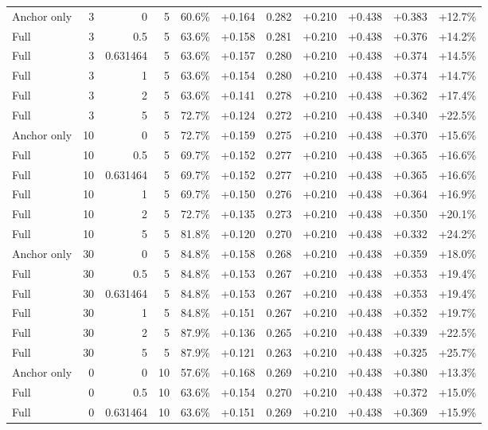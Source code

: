 \begin{table}[htbp]
\begin{tabular}{lrrrccccccc}
Anchor only & 3 & 0 & 5 & 60.6\% & +0.164 & 0.282 & +0.210 & +0.438 & +0.383 & +12.7\% \\
Full & 3 & 0.5 & 5 & 63.6\% & +0.158 & 0.281 & +0.210 & +0.438 & +0.376 & +14.2\% \\
Full & 3 & 0.631464 & 5 & 63.6\% & +0.157 & 0.280 & +0.210 & +0.438 & +0.374 & +14.5\% \\
Full & 3 & 1 & 5 & 63.6\% & +0.154 & 0.280 & +0.210 & +0.438 & +0.374 & +14.7\% \\
Full & 3 & 2 & 5 & 63.6\% & +0.141 & 0.278 & +0.210 & +0.438 & +0.362 & +17.4\% \\
Full & 3 & 5 & 5 & 72.7\% & +0.124 & 0.272 & +0.210 & +0.438 & +0.340 & +22.5\% \\
Anchor only & 10 & 0 & 5 & 72.7\% & +0.159 & 0.275 & +0.210 & +0.438 & +0.370 & +15.6\% \\
Full & 10 & 0.5 & 5 & 69.7\% & +0.152 & 0.277 & +0.210 & +0.438 & +0.365 & +16.6\% \\
Full & 10 & 0.631464 & 5 & 69.7\% & +0.152 & 0.277 & +0.210 & +0.438 & +0.365 & +16.6\% \\
Full & 10 & 1 & 5 & 69.7\% & +0.150 & 0.276 & +0.210 & +0.438 & +0.364 & +16.9\% \\
Full & 10 & 2 & 5 & 72.7\% & +0.135 & 0.273 & +0.210 & +0.438 & +0.350 & +20.1\% \\
Full & 10 & 5 & 5 & 81.8\% & +0.120 & 0.270 & +0.210 & +0.438 & +0.332 & +24.2\% \\
Anchor only & 30 & 0 & 5 & 84.8\% & +0.158 & 0.268 & +0.210 & +0.438 & +0.359 & +18.0\% \\
Full & 30 & 0.5 & 5 & 84.8\% & +0.153 & 0.267 & +0.210 & +0.438 & +0.353 & +19.4\% \\
Full & 30 & 0.631464 & 5 & 84.8\% & +0.153 & 0.267 & +0.210 & +0.438 & +0.353 & +19.4\% \\
Full & 30 & 1 & 5 & 84.8\% & +0.151 & 0.267 & +0.210 & +0.438 & +0.352 & +19.7\% \\
Full & 30 & 2 & 5 & 87.9\% & +0.136 & 0.265 & +0.210 & +0.438 & +0.339 & +22.5\% \\
Full & 30 & 5 & 5 & 87.9\% & +0.121 & 0.263 & +0.210 & +0.438 & +0.325 & +25.7\% \\
Anchor only & 0 & 0 & 10 & 57.6\% & +0.168 & 0.269 & +0.210 & +0.438 & +0.380 & +13.3\% \\
Full & 0 & 0.5 & 10 & 63.6\% & +0.154 & 0.270 & +0.210 & +0.438 & +0.372 & +15.0\% \\
Full & 0 & 0.631464 & 10 & 63.6\% & +0.151 & 0.269 & +0.210 & +0.438 & +0.369 & +15.9\% \\

\end{tabular}
\end{table}
